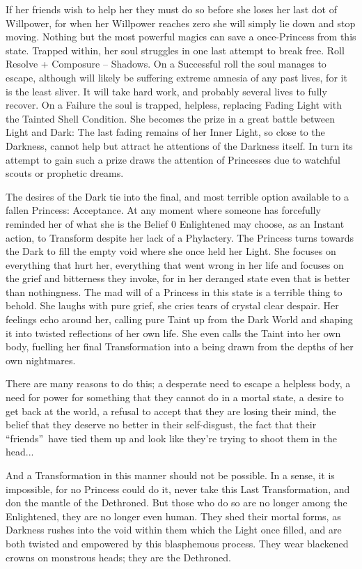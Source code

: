 If her friends wish to help her they must do so before she loses her last dot of Willpower, for when her Willpower reaches zero she will simply lie down and stop moving. Nothing but the most powerful magics can save a once-Princess from this state. Trapped within, her soul struggles in one last attempt to break free. Roll Resolve + Composure – Shadows. On a Successful roll the soul manages to escape, although will likely be suffering extreme amnesia of any past lives, for it is the least sliver. It will take hard work, and probably several lives to fully recover. On a Failure the soul is trapped, helpless, replacing Fading Light with the Tainted Shell Condition. She becomes the prize in a great battle between Light and Dark: The last fading remains of her Inner Light, so close to the Darkness, cannot help but attract he attentions of the Darkness itself. In turn its attempt to gain such a prize draws the attention of Princesses due to watchful scouts or prophetic dreams.

The desires of the Dark tie into the final, and most terrible option available to a fallen Princess: Acceptance. At any moment where someone has forcefully reminded her of what she is the Belief 0 Enlightened may choose, as an Instant action, to Transform despite her lack of a Phylactery. The Princess turns towards the Dark to fill the empty void where she once held her Light. She focuses on everything that hurt her, everything that went wrong in her life and focuses on the grief and bitterness they invoke, for in her deranged state even that is better than nothingness. The mad will of a Princess in this state is a terrible thing to behold. She laughs with pure grief, she cries tears of crystal clear despair. Her feelings echo around her, calling pure Taint up from the Dark World and shaping it into twisted reflections of her own life. She even calls the Taint into her own body, fuelling her final Transformation into a being drawn from the depths of her own nightmares.

There are many reasons to do this; a desperate need to escape a helpless body, a need for power for something that they cannot do in a mortal state, a desire to get back at the world, a refusal to accept that they are losing their mind, the belief that they deserve no better in their self-disgust, the fact that their \textquotedblleft friends\textquotedblright\, have tied them up and look like they're trying to shoot them in the head...

And a Transformation in this manner should not be possible. In a sense, it is impossible, for no Princess could do it, never take this Last Transformation, and don the mantle of the Dethroned. But those who do so are no longer among the Enlightened, they are no longer even human. They shed their mortal forms, as Darkness rushes into the void within them which the Light once filled, and are both twisted and empowered by this blasphemous process. They wear blackened crowns on monstrous heads; they are the Dethroned. 


